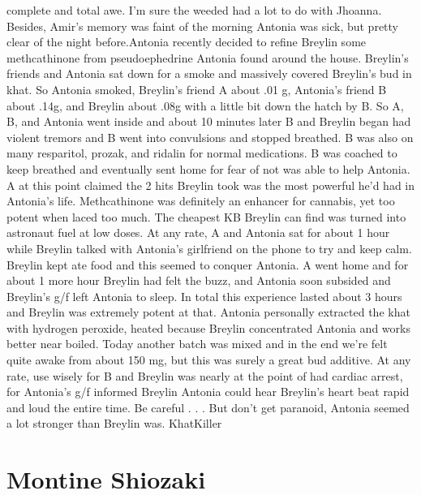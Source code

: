 \documentclass[12pt]{book}
\begin{document}
complete and total awe. I'm sure the weeded had a lot to do with Jhoanna. Besides, Amir's memory was faint of the morning Antonia was sick, but pretty clear of the night before.Antonia recently decided to refine Breylin some methcathinone from pseudoephedrine Antonia found around the house. Breylin's friends and Antonia sat down for a smoke and massively covered Breylin's bud in khat. So Antonia smoked, Breylin's friend A about .01 g, Antonia's friend B about .14g, and Breylin about .08g with a little bit down the hatch by B. So A, B, and Antonia went inside and about 10 minutes later B and Breylin began had violent tremors and B went into convulsions and stopped breathed. B was also on many resparitol, prozak, and ridalin for normal medications. B was coached to keep breathed and eventually sent home for fear of not was able to help Antonia. A at this point claimed the 2 hits Breylin took was the most powerful he'd had in Antonia's life. Methcathinone was definitely an enhancer for cannabis, yet too potent when laced too much. The cheapest KB Breylin can find was turned into astronaut fuel at low doses. At any rate, A and Antonia sat for about 1 hour while Breylin talked with Antonia's girlfriend on the phone to try and keep calm. Breylin kept ate food and this seemed to conquer Antonia. A went home and for about 1 more hour Breylin had felt the buzz, and Antonia soon subsided and Breylin's g/f left Antonia to sleep. In total this experience lasted about 3 hours and Breylin was extremely potent at that. Antonia personally extracted the khat with hydrogen peroxide, heated because Breylin concentrated Antonia and works better near boiled. Today another batch was mixed and in the end we're felt quite awake from about 150 mg, but this was surely a great bud additive. At any rate, use wisely for B and Breylin was nearly at the point of had cardiac arrest, for Antonia's g/f informed Breylin Antonia could hear Breylin's heart beat rapid and loud the entire time. Be careful . . .  But don't get paranoid, Antonia seemed a lot stronger than Breylin was. KhatKiller



\chapter{Montine Shiozaki}
\end{document}
